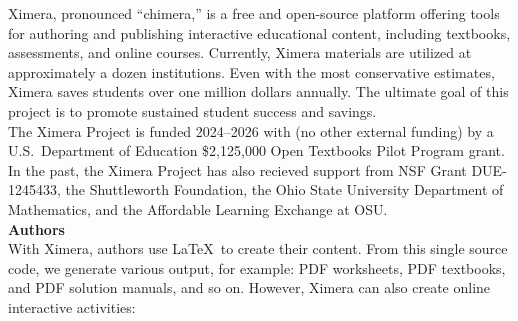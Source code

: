 \documentclass{article}
\begin{document}
\begin{multicols}{2}
    Ximera, pronounced ``chimera,'' is a free and
    open-source platform offering tools for authoring and publishing
    interactive educational content, including textbooks, assessments, and
    online
    courses. Currently, Ximera materials are utilized at approximately a dozen
    institutions. Even with the most conservative estimates, Ximera saves
    students
    over one million dollars annually. The ultimate goal of this project is to
    promote sustained student success and savings.\\[.3cm]

    The Ximera Project is funded 2024--2026 with (no other external funding) by
    a U.S.\ Department of Education \$2,125,000
    Open Textbooks Pilot Program grant. In the past, the Ximera Project has
    also recieved support from NSF Grant
    DUE-1245433, the Shuttleworth Foundation, the Ohio State University
    Department of Mathematics, and the Affordable Learning Exchange at OSU.
    \\[.5cm]
    {\sffamily\bfseries Authors}\\
    With Ximera, authors use \LaTeX\ to create their content. From this single
    source code, we generate various output, for example: PDF worksheets, PDF
    textbooks, and	PDF solution manuals, and so on. However, Ximera can
    also create
    online interactive activities:
    \begin{center}
\end{center}
\end{multicols}
\end{document}
